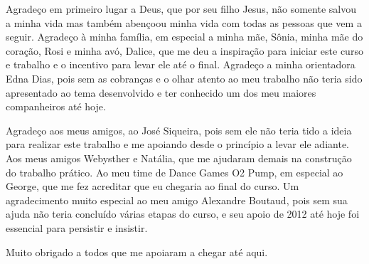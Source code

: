 Agradeço em primeiro lugar a Deus, que por seu filho Jesus, não somente salvou a minha vida mas também abençoou minha vida com todas as pessoas que vem a seguir. Agradeço à minha família, em especial a minha mãe, Sônia, minha mãe do coração, Rosi e minha avó, Dalice, que me deu a inspiração para iniciar este curso e trabalho e o incentivo para levar ele até o final. Agradeço a minha orientadora Edna Dias, pois sem as cobranças e o olhar atento ao meu trabalho não teria sido apresentado ao tema desenvolvido e ter conhecido um dos meu maiores companheiros até hoje. 

Agradeço aos meus amigos, ao José Siqueira, pois sem ele não teria tido a ideia para realizar este trabalho e me apoiando desde o princípio a levar ele adiante. Aos meus amigos Webysther e Natália, que me ajudaram demais na construção do trabalho prático. Ao meu time de Dance Games O2 Pump, em especial ao George, que me fez acreditar que eu chegaria ao final do curso. Um agradecimento muito especial ao meu amigo Alexandre Boutaud, pois sem sua ajuda não teria concluído várias etapas do curso, e seu apoio de 2012 até hoje foi essencial para persistir e insistir.

Muito obrigado a todos que me apoiaram a chegar até aqui.

